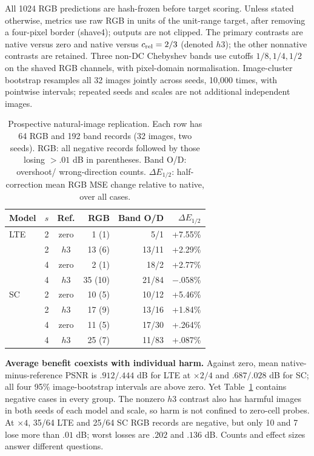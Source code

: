 All 1024 RGB predictions are hash-frozen before target scoring. Unless
stated otherwise, metrics use raw RGB in units of the unit-range target,
after removing a four-pixel border (shave4); outputs are not clipped. The primary
contrasts are native versus zero and native versus $c_{\rm rel}=2/3$
(denoted $h3$); the other nonnative contrasts are retained. Three non-DC
Chebyshev bands use cutoffs $1/8,1/4,1/2$ on the shaved RGB channels,
with pixel-domain normalisation. Image-cluster bootstrap resamples all
32 images jointly across seeds, 10,000 times, with pointwise intervals;
repeated seeds and scales are not additional independent images.

\begin{table}[t]\centering
\caption{Prospective natural-image replication. Each row has 64 RGB and
192 band records (32 images, two seeds). RGB: all negative records
followed by those losing $>.01$ dB in parentheses. Band O/D: overshoot/
wrong-direction counts. $\Delta E_{1/2}$: half-correction mean RGB MSE
change relative to native, over all cases.}
\label{tab:failures}
\small
\begin{tabular}{lccrrr}\toprule
Model & $s$ & Ref. & RGB & Band O/D & $\Delta E_{1/2}$\\\midrule
LTE & 2 & zero & 1 (1) & 5/1 & +7.55\%\\
 & 2 & $h3$ & 13 (6) & 13/11 & +2.29\%\\
 & 4 & zero & 2 (1) & 18/2 & +2.77\%\\
 & 4 & $h3$ & 35 (10) & 21/84 & $-.058$\%\\\midrule
SC & 2 & zero & 10 (5) & 10/12 & +5.46\%\\
 & 2 & $h3$ & 17 (9) & 13/16 & +1.84\%\\
 & 4 & zero & 11 (5) & 17/30 & +.264\%\\
 & 4 & $h3$ & 25 (7) & 11/83 & +.087\%\\\bottomrule
\end{tabular}
\end{table}

\textbf{Average benefit coexists with individual harm.}
Against zero, mean native-minus-reference PSNR is $.912/.444$ dB for
LTE at $\times2/4$ and $.687/.028$ dB for SC; all four 95\% image-bootstrap
intervals are above zero. Yet Table~\ref{tab:failures} contains negative
cases in every group. The nonzero $h3$ contrast also has harmful images
in both seeds of each model and scale, so harm is not confined to zero-cell
probes. At $\times4$, 35/64 LTE and 25/64 SC RGB records are negative,
but only 10 and 7 lose more than $.01$ dB; worst losses are $.202$ and
$.136$ dB. Counts and effect sizes answer different questions.


